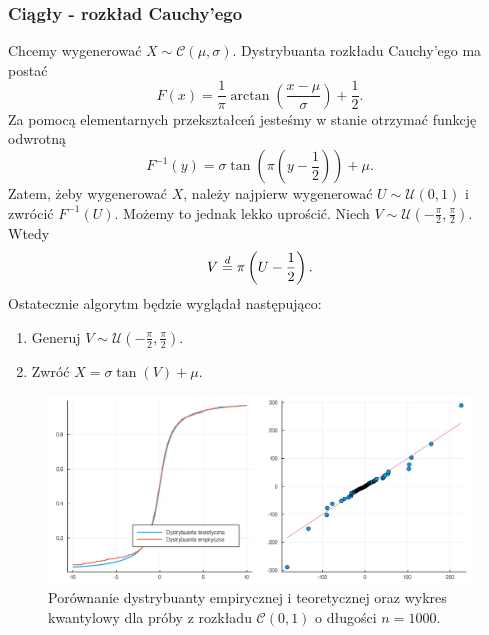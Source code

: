 \documentclass[12pt]{mwrep}
\begin{document}
	\subsubsection{Ciągły - rozkład Cauchy'ego}
	\noindent Chcemy wygenerować $ X \sim \mathcal{C}(\mu, \sigma) $. 
	Dystrybuanta rozkładu Cauchy'ego ma postać
	$$ F(x) = \frac{1}{\pi} \arctan{\left(\frac{x - \mu}{\sigma}\right)} + \frac{1}{2}. $$
	Za pomocą elementarnych przekształceń jesteśmy w stanie otrzymać funkcję odwrotną
	$$ F^{-1}(y) = \sigma \tan \left(\pi \left(y - \frac{1}{2}\right) \right) + \mu. $$
	Zatem, żeby wygenerować $X$, należy najpierw wygenerować $U \sim \mathcal{U}(0, 1) $ i zwrócić $F^{-1}(U)$. Możemy to jednak lekko uprościć. Niech $ V \sim \mathcal{U}\left(-\frac{\pi}{2}, \frac{\pi}{2}\right) $. Wtedy
	$$ V \buildrel{d}\over{=} \pi \left(U - \frac{1}{2}\right). $$
	Ostatecznie algorytm będzie wyglądał następująco:
	\begin{enumerate}[leftmargin=10mm]
		\item Generuj $V \sim \mathcal{U}\left(-\frac{\pi}{2}, \frac{\pi}{2}\right)$.
		\item Zwróć $ X = \sigma \tan(V) + \mu $.
	\end{enumerate}
	\begin{figure}[H]
		\centering
		\caption{Porównanie dystrybuanty empirycznej i teoretycznej oraz wykres kwantylowy dla próby z rozkładu $\mathcal{C}(0, 1)$ o długości $n = 1000$.}
		\includegraphics[scale=0.1]{fig/fig_odwr2.png}
	\end{figure}
\end{document}
